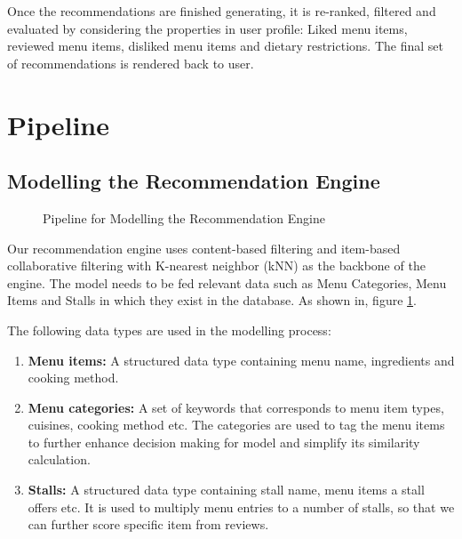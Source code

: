 Once the recommendations are finished generating, it is re-ranked, filtered and evaluated by considering the properties in user profile: Liked menu items, reviewed menu items, disliked menu items and dietary restrictions. The final set of recommendations is rendered back to user.


\newpage

\section{Pipeline}
\label{section:pipeline}

\subsection{Modelling the Recommendation Engine}
\begin{figure}[h!]
    \centering
    \caption{Pipeline for Modelling the Recommendation Engine}
    \label{fig:pipeline-for-modelling}
\end{figure}

Our recommendation engine uses content-based filtering and item-based collaborative filtering
with K-nearest neighbor (kNN) as the backbone of the engine. \cite{singhanddwivedi:2023}
The model needs to be fed relevant data such as Menu Categories, Menu Items and Stalls in which they exist in
the database. As shown in, figure \ref{fig:pipeline-for-modelling}.

The following data types are used in the modelling process:

\begin{enumerate}[leftmargin=80pt]
    \item \textbf{Menu items:} A structured data type containing menu name, ingredients and cooking method.
    \item \textbf{Menu categories:} A set of keywords that corresponds to menu item types, cuisines, cooking method etc.
    The categories are used to tag the menu items to further enhance decision making for model and simplify its
    similarity calculation.
    \item \textbf{Stalls:} A structured data type containing stall name, menu items a stall offers etc.
    It is used to multiply menu entries to a number of stalls, so that we can further score specific item from reviews.
\end{enumerate}

